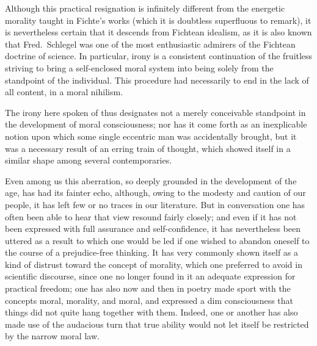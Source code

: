 \documentclass[12pt]{article}
\newcommand{\opage}[1]{\marginnote{\footnotesize\textit{[#1]}}}
\begin{document}
Although this practical resignation is infinitely different from \opage{156}the energetic morality taught in Fichte's works (which it is doubtless superfluous to remark), it is nevertheless certain that it descends from Fichtean idealism, as it is also known that Fred.\ Schlegel was one of the most enthusiastic admirers of the Fichtean doctrine of science. In particular, irony is a consistent continuation of the fruitless striving to bring a self-enclosed moral system into being solely from the standpoint of the individual. This procedure had necessarily to end in the lack of all content, in a moral nihilism.

The irony here spoken of thus designates not a merely conceivable standpoint in the development of moral consciousness; nor has it come forth as an inexplicable notion upon which some single eccentric man was accidentally brought, but it was a necessary result of an erring train of thought, which showed itself in a similar shape among several contemporaries.

Even among us this aberration, so deeply grounded in the development of the age, has had its fainter echo, although, owing to the modesty and caution of our people, it has left few or no traces in our literature. But in conversation one has often been able to hear that view resound fairly closely; and even if it has not been expressed with full assurance and self-confidence, it has nevertheless been uttered as a result to which one would be led if one wished to abandon oneself to the course of a prejudice-free thinking. It has very commonly shown itself as a kind of distrust toward the concept of morality, which one preferred to avoid in scientific discourse, since one no longer found in it an adequate expression for practical freedom; one has also now and then in poetry made sport with the concepts moral, morality, and moral, and expressed a dim consciousness that things did not quite hang together with them. Indeed, one or another has also made use of the audacious turn that true ability would not let itself be restricted by the narrow moral law.
\end{document}
